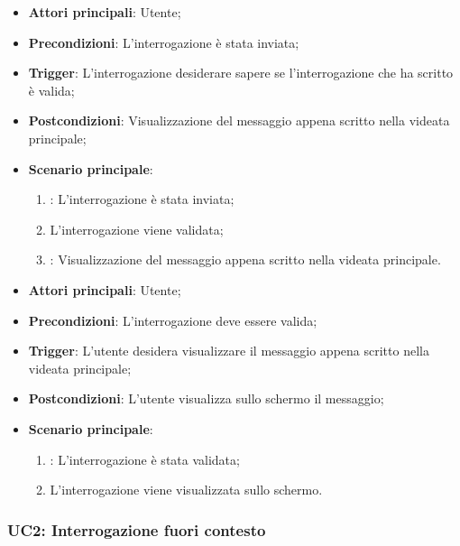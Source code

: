 \hypertarget{UC1.3}{}
\begin{itemize}
    \item \textbf{Attori principali}: Utente;
    \item \textbf{Precondizioni}: L'interrogazione è stata inviata;
    \item \textbf{Trigger}: L'interrogazione desiderare sapere se l'interrogazione che ha scritto è valida;
    \item \textbf{Postcondizioni}: Visualizzazione del messaggio appena scritto nella videata principale;
    \item \textbf{Scenario principale}:
    \begin{enumerate}
        \item {}: L'interrogazione è stata inviata;
        \item L'interrogazione viene validata;
        \item {}: Visualizzazione del messaggio appena scritto nella videata principale.
    \end{enumerate}
\end{itemize}

\hypertarget{UC1.4}{}
\begin{itemize}
    \item \textbf{Attori principali}: Utente;
    \item \textbf{Precondizioni}: L'interrogazione deve essere valida;
    \item \textbf{Trigger}: L'utente desidera visualizzare il messaggio appena scritto nella videata principale;
    \item \textbf{Postcondizioni}: L'utente visualizza sullo schermo il messaggio;
    \item \textbf{Scenario principale}:
    \begin{enumerate}
        \item {}: L'interrogazione è stata validata;
        \item L'interrogazione viene visualizzata sullo schermo.
    \end{enumerate}
\end{itemize}


\hypertarget{UC2}{}
\subsubsection{UC2: Interrogazione fuori contesto}

